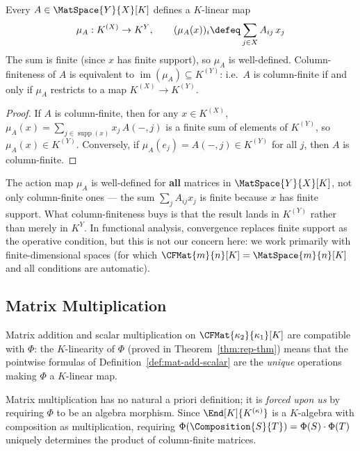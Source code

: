 \begin{proposition}
\label{prop:action-map}
    Every $A \in \MatSpace{Y}{X}[K]$ defines a $K$-linear map
    \[
        \mu_A: K^{(X)} \to K^Y, \qquad
        (\mu_A(x))_i \defeq \sum_{j \in X} A_{ij}\, x_j
    \]
    The sum is finite (since $x$ has finite support), so $\mu_A$ is well-defined.
    Column-finiteness of $A$ is equivalent to
    $\operatorname{im}(\mu_A) \subseteq K^{(Y)}$: i.e.\ $A$ is column-finite if and only if
    $\mu_A$ restricts to a map $K^{(X)} \to K^{(Y)}$.
\end{proposition}

\begin{proof}
    If $A$ is column-finite, then for any $x \in K^{(X)}$,
    $\mu_A(x) = \sum_{j \in \operatorname{supp}(x)} x_j\, A(-,j)$ is a finite sum of
    elements of $K^{(Y)}$, so $\mu_A(x) \in K^{(Y)}$. Conversely, if
    $\mu_A(e_j) = A(-,j) \in K^{(Y)}$ for all $j$, then $A$ is column-finite.
\end{proof}

\begin{remark}[Scope]
    The action map $\mu_A$ is well-defined for \textbf{all} matrices in $\MatSpace{Y}{X}[K]$,
    not only column-finite ones --- the sum $\sum_j A_{ij} x_j$ is finite because $x$ has
    finite support. What column-finiteness buys is that the result lands in $K^{(Y)}$ rather
    than merely in $K^Y$. In functional analysis, convergence replaces finite support as the
    operative condition, but this is not our concern here: we work primarily with
    finite-dimensional spaces (for which $\CFMat{m}{n}[K] = \MatSpace{m}{n}[K]$ and all
    conditions are automatic).
\end{remark}


\newpage
\subsection{Matrix Multiplication}

\begin{remark}
    Matrix addition and scalar multiplication on $\CFMat{\kappa_2}{\kappa_1}[K]$ are
    compatible with $\Phi$: the $K$-linearity of $\Phi$ (proved in
    Theorem~\ref{thm:rep-thm}) means that the pointwise formulas of
    Definition~\ref{def:mat-add-scalar} are the \emph{unique} operations making $\Phi$ a
    $K$-linear map.

    Matrix multiplication has no natural a priori definition; it is \emph{forced upon us} by
    requiring $\Phi$ to be an algebra morphism. Since $\End[K]{K^{(\kappa)}}$ is a $K$-algebra
    with composition as multiplication, requiring
    $\Phi(\Composition{S}{T}) = \Phi(S) \cdot \Phi(T)$ uniquely determines the product of
    column-finite matrices.
\end{remark}

